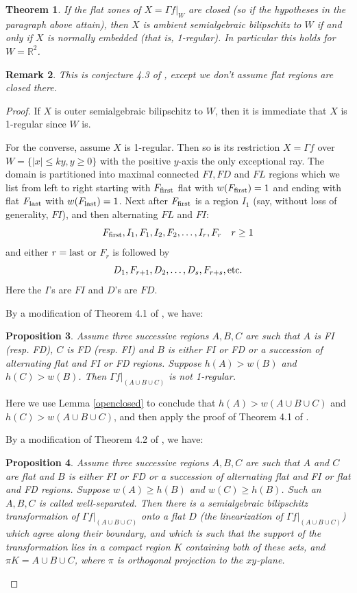 \documentclass[article]{amsart}
\newtheorem{theorem}{Theorem}[section]
\newtheorem{proposition}[theorem]{Proposition}
\newtheorem{remark}[theorem]{Remark}
\newcommand{\R}{\mathbb R}
\newcommand{\0}{{\bf 0}}
\begin{document}
\begin{theorem}
If the flat zones of $X=\Gamma f|_W$ are closed (so if the hypotheses in the paragraph above attain), then $X$ is ambient semialgebraic bilipschitz to $W$ if and only if $X$ is normally embedded (that is,
1-regular).  In particular this holds for $W=\R^2$. %
\end{theorem}
\begin{remark} This is conjecture 4.3 of \cite{OW1}, except we don't assume flat regions are closed there. \end{remark}
\begin{proof}
If $X$ is outer semialgebraic bilipschitz to $W$, then it is immediate that $X$ is 1-regular since $W$ is.

For the converse, assume $X$ is 1-regular. Then so is its restriction $X =\Gamma f$ over $W=\{ |x| \le ky, y \ge 0\}$ with the positive $y$-axis the only
exceptional ray.  The domain is partitioned into maximal connected $FI, FD$ and $FL$ regions which we list from left to right starting with $F_{\rm first}$ flat with $w(F_{\rm first}) = 1$ and ending with flat $F_{\rm last}$ with $w(F_{\rm last}) = 1$.  Next after $F_{\rm first}$ is a region $I_1$ (say, without loss of generality, $FI$), and then alternating $FL$ and $FI$:
$$
F_{\rm first}, I_1, F_1, I_2, F_2, \ldots, I_r, F_r\quad r\ge 1
$$
and either $r = {\rm last}$ or $F_r$ is followed by 
$$
D_1, F_{r+1}, D_2, \ldots, D_s,  F_{r + s}, {\rm etc.}  
$$
Here the $I$'s are $FI$ and $D$'s are $FD$.
 \newline
 
 By a modification of Theorem 4.1 of \cite{OW1}, we have:
\begin{proposition}\label{notregular}  Assume three successive regions $A,B,C$ are such that  $A$ is FI (resp. FD), $C$ is FD (resp. FI) and $B$ is either FI or FD or a succession of alternating flat and FI or FD regions. Suppose $h(A)> w(B)$ and $h(C)> w(B)$.  Then $\Gamma f|_{(A\cup B\cup C)}$ is not 1-regular.
\end{proposition}

Here we use Lemma \ref{openclosed} to conclude that $h(A ) >w(A\cup B\cup C)$ and   $h( C ) >w(A\cup B\cup C)$, and then apply the proof of Theorem 4.1 of \cite{OW1}.
\newline

By a modification of Theorem 4.2 of \cite{OW1}, we have:

\begin{proposition} \label{wellseparated} Assume three successive regions $A,B,C$ are such that $A$ and $C$ are flat and $B$ is either FI or FD or a succession of alternating flat and FI or flat and FD regions. Suppose $w(A)\ge h(B)$ and $w(C)\ge h(B)$.  Such an $A,B,C$ is called {\rm well-separated}.%
Then there is a semialgebraic bilipschitz transformation of $\Gamma f|_{(A\cup B\cup C)}$ onto a flat $D$ (the linearization of $\Gamma f|_{(A\cup B\cup C)}$) which agree along their boundary, and which is such that %
the support of the transformation lies in a compact region $K$ containing both of these sets, and $\pi K=A\cup B\cup C$, where $\pi$ is orthogonal projection to the $xy$-plane.
\end{proposition}


\end{proof}
\end{document}
